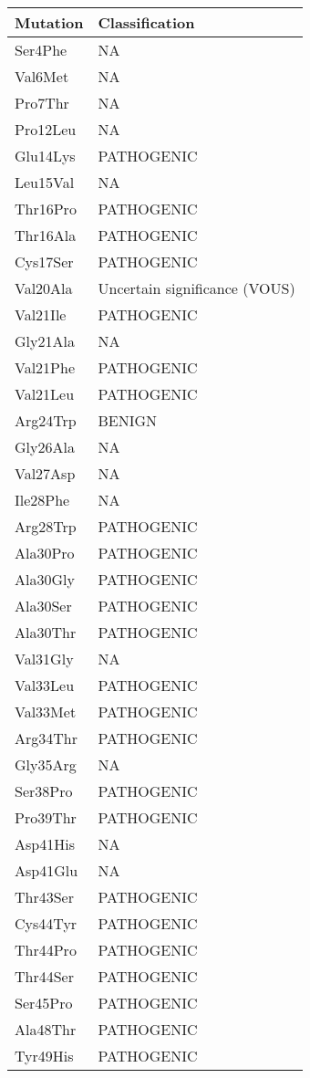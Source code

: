 \begin{longtable}[l]{l|l}
	Mutation & Classification\\ \hline
	Ser4Phe & NA \\
	Val6Met & NA \\
	Pro7Thr & NA \\
	Pro12Leu & NA \\
	Glu14Lys & PATHOGENIC \\
	Leu15Val & NA \\
	Thr16Pro & PATHOGENIC \\
	Thr16Ala & PATHOGENIC \\
	Cys17Ser & PATHOGENIC \\
	Val20Ala & Uncertain significance (VOUS) \\
	Val21Ile & PATHOGENIC \\
	Gly21Ala & NA \\
	Val21Phe & PATHOGENIC \\
	Val21Leu & PATHOGENIC \\
	Arg24Trp & BENIGN \\
	Gly26Ala & NA \\
	Val27Asp & NA \\
	Ile28Phe & NA \\
	Arg28Trp & PATHOGENIC \\
	Ala30Pro & PATHOGENIC \\
	Ala30Gly & PATHOGENIC \\
	Ala30Ser & PATHOGENIC \\
	Ala30Thr & PATHOGENIC \\
	Val31Gly & NA \\
	Val33Leu & PATHOGENIC \\
	Val33Met & PATHOGENIC \\
	Arg34Thr & PATHOGENIC \\
	Gly35Arg & NA \\
	Ser38Pro & PATHOGENIC \\
	Pro39Thr & PATHOGENIC \\
	Asp41His & NA \\
	Asp41Glu & NA \\
	Thr43Ser & PATHOGENIC \\
	Cys44Tyr & PATHOGENIC \\
	Thr44Pro & PATHOGENIC \\
	Thr44Ser & PATHOGENIC \\
	Ser45Pro & PATHOGENIC \\
	Ala48Thr & PATHOGENIC \\
	Tyr49His & PATHOGENIC \\

\end{longtable}

